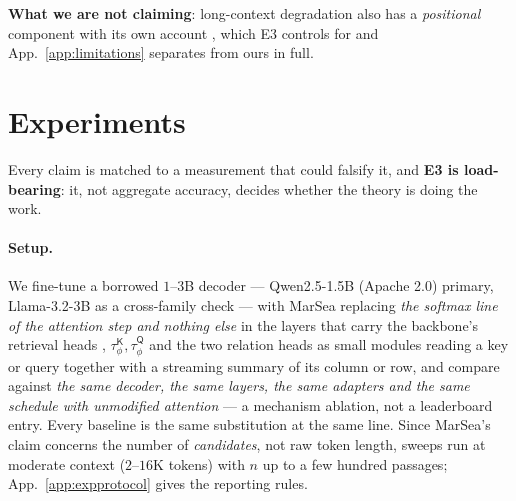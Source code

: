 \documentclass{article}
\newcommand{\tauK}{\tau^{\mathsf{K}}_\phi}
\newcommand{\tauQ}{\tau^{\mathsf{Q}}_\phi}
\begin{document}
\textbf{What we are not claiming}: long-context degradation also has a \emph{positional}
component with its own account \citep{chowdhury2026birth,wu2025emergence,herasimchyk2026residual},
which E3 controls for and App.~\ref{app:limitations} separates from ours in full.

\section{Experiments}
\label{sec:experiments}

Every claim is matched to a measurement that could falsify it, and \textbf{E3 is load-bearing}:
it, not aggregate accuracy, decides whether the theory is doing the work.
\paragraph{Setup.} We fine-tune a borrowed $1$--$3$B decoder --- Qwen2.5-1.5B (Apache 2.0)
primary, Llama-3.2-3B as a cross-family check --- with MarSea replacing \emph{the softmax line of
the attention step and nothing else} in the layers that carry the backbone's retrieval heads
\citep{wu2024retrieval}, $\tauK,\tauQ$ and the two relation heads as small modules reading a key
or query together with a streaming summary of its column or row, and compare against \emph{the
same decoder, the same layers, the same adapters and the same schedule with unmodified
attention} --- a mechanism ablation, not a leaderboard entry. Every baseline is the same
substitution at the same line. Since MarSea's claim concerns the number of \emph{candidates}, not raw token
length, sweeps run at moderate context ($2$--$16$K tokens) with $n$ up to a few hundred passages;
App.~\ref{app:expprotocol} gives the reporting rules.
\end{document}
